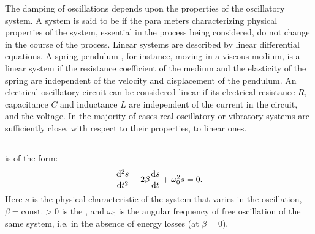 The damping of oscillations depends upon the properties of the oscillatory system. A system is said to be  if the para­ meters characterizing physical properties of the system, essential in the process being considered, do not change in the course of the process. Linear systems are described by linear differential equations. A spring pendulum , for instance, moving in a viscous medium, is a linear system if the resistance coefficient of the medium and the elasticity of the spring are independent of the velocity and displacement of the pendulum. An electrical oscillatory circuit  can be considered linear if its electrical resistance $R$, capacitance $C$ and inductance $L$ are independent of the current in the circuit, and the voltage. In the majority of cases real oscillatory or vibratory systems arc sufficiently close, with respect to their properties, to linear ones.

\subsection{}\label{29.1.2}  is of the form:
\begin{equation}%
\dv[2]{s}{t} + 2 \beta \dv{s}{t} + \omega_{0}^{2}s = 0.
\end{equation}
Here $s$ is the physical characteristic of the system that varies in the oscillation, $\beta = \text{const.} > 0$ is the , and $\omega_{0}$ is the angular frequency of free  oscillation of the same system, i.e. in the absence of energy losses (at $\beta = 0$).

